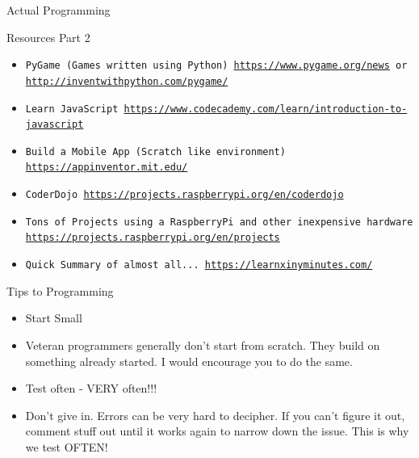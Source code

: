 \documentclass[10pt]{beamer}
\begin{document}
{\begin{frame}{Actual Programming}{}
\begin{block}{Resources Part 2}
  \begin{itemize}
    \item {\tt PyGame (Games written using Python) \url{https://www.pygame.org/news} or \url{http://inventwithpython.com/pygame/}}
    \item {\tt Learn JavaScript \url{https://www.codecademy.com/learn/introduction-to-javascript}}
    \item {\tt Build a Mobile App (Scratch like environment) \url{https://appinventor.mit.edu/}}
    \item  {\tt CoderDojo \url{https://projects.raspberrypi.org/en/coderdojo}}
    \item {\tt Tons of Projects using a RaspberryPi and other inexpensive hardware \url{https://projects.raspberrypi.org/en/projects}}
    \item {\tt Quick Summary of almost all... \url{https://learnxinyminutes.com/}}
    \end{itemize}
  \end{block}
\end{frame}


\begin{frame}{Tips to Programming}{}
\begin{block}{}
  \begin{itemize}
    \item {Start Small}
    \item {Veteran programmers generally don't start from scratch.  They build on something already started.  I would encourage you to do the same.}
    \item {Test often - VERY often!!!}
    \item {Don't give in.  Errors can be very hard to decipher.  If you can't figure it out, comment stuff out until it works again to narrow down the issue.  This is why we test OFTEN!}
    \end{itemize}
  \end{block}
\end{frame}


}
\end{document}
